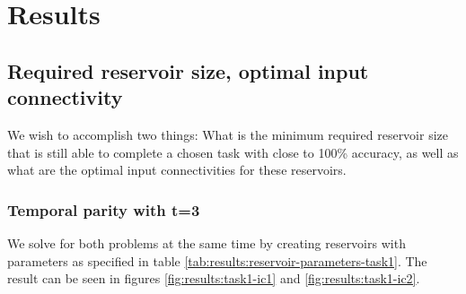 \chapter{Results}

\section{Required reservoir size, optimal input connectivity}

We wish to accomplish two things: What is the minimum required reservoir size that is still able to complete a chosen task with close to 100\% accuracy, as well as what are the optimal input connectivities for these reservoirs.

%            
%            
%            
%            
%            
%            
%            
%            
%            
%            

\subsection{Temporal parity with t=3}

We solve for both problems at the same time by creating reservoirs with parameters as specified in table \ref{tab:results:reservoir-parameters-task1}.
The result can be seen in figures \ref{fig:results:task1-ic1} and \ref{fig:results:task1-ic2}.

